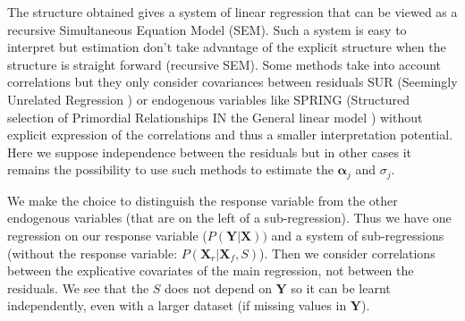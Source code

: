 \documentclass[11pt,a4paper]{article}
\begin{document}

The structure obtained gives a system of linear regression that can be viewed as a recursive Simultaneous Equation Model (\textsc{SEM})\cite{davidson1993estimation}. Such a system is easy to interpret but estimation don't take advantage of the explicit structure \cite{TIMM} when the structure is straight forward (recursive \textsc{SEM}).
  	Some methods take into account correlations but they only consider covariances between residuals \textsc{SUR} (Seemingly Unrelated Regression \cite{SURzellner}) or  endogenous variables like \textsc{SPRING} (Structured selection of Primordial Relationships IN the General linear model \cite{chiquetconf}) without explicit expression of the correlations and thus a smaller interpretation potential.
  	\\ Here we suppose independence between the residuals but in other cases it remains the possibility to use such methods to estimate the $\boldsymbol{\alpha}_j$ and $\sigma_j$.

 	
	  We make the choice to distinguish the response variable from the other endogenous variables (that are on the left of a sub-regression). Thus we have one regression on our response variable ($P(\boldsymbol{Y}|\boldsymbol{X}))$ and a system of sub-regressions (without the response variable: $P(\boldsymbol{X}_r|\boldsymbol{X}_f,S)$). Then we consider correlations between the explicative covariates of the main regression, not between the residuals. We see that the $S$ does not depend on $\boldsymbol{Y}$ so it can be learnt independently, even with a larger dataset (if missing values in $\boldsymbol{Y}$).
	 


	
\end{document}
